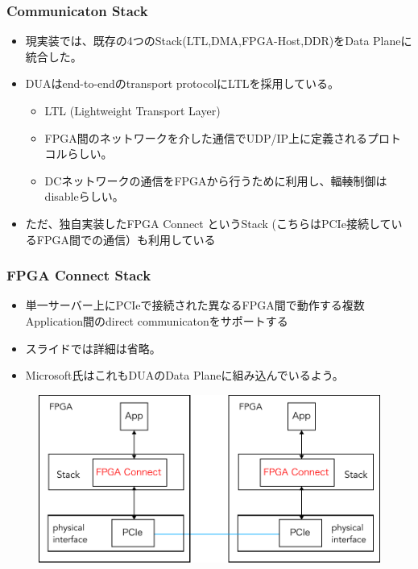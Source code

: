 \documentclass[dvipdfmx,9pt,notheorems]{beamer}
\theoremstyle{definition}
\begin{document}
\begin{frame}\frametitle{Communicaton Stack}
	\begin{itemize}
		\item 現実装では、既存の4つのStack(LTL,DMA,FPGA-Host,DDR)をData Planeに統合した。
		\item DUAはend-to-endのtransport protocolにLTLを採用している。
			\begin{itemize}
				\item LTL (Lightweight Transport Layer)
				\item FPGA間のネットワークを介した通信でUDP/IP上に定義されるプロトコルらしい。
				\item DCネットワークの通信をFPGAから行うために利用し、輻輳制御はdisableらしい。
			\end{itemize}
		\item ただ、独自実装したFPGA Connect というStack (こちらはPCIe接続しているFPGA間での通信）も利用している
	\end{itemize}
\pnote{
}
\end{frame}

\begin{frame}\frametitle{FPGA Connect Stack}
	\begin{itemize}
		\item 単一サーバー上にPCIeで接続された異なるFPGA間で動作する複数Application間のdirect communicatonをサポートする
		\item スライドでは詳細は省略。
		\item Microsoft氏はこれもDUAのData Planeに組み込んでいるよう。
	\end{itemize}
  \begin{figure}[htb]
		\includegraphics[scale=0.5]{fig/ez_FPGA_Connect.pdf}
  \end{figure}
\pnote{
}
\end{frame}
\end{document}
